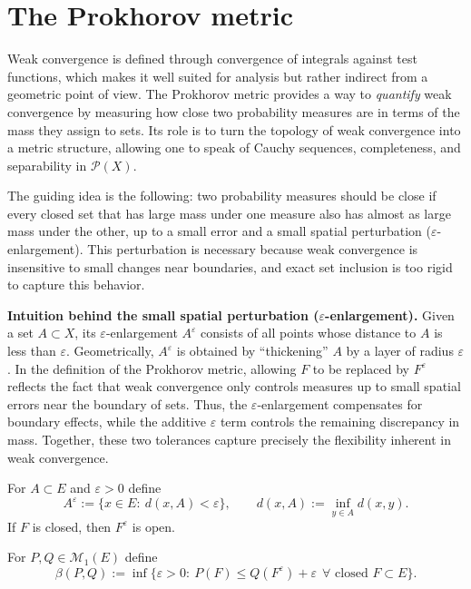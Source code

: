 \section{The Prokhorov metric}

Weak convergence is defined through convergence of integrals against test functions, which makes it well suited for analysis but rather indirect from a geometric point of view.
The Prokhorov metric provides a way to \emph{quantify} weak convergence by measuring how close two probability measures are in terms of the mass they assign to sets.
Its role is to turn the topology of weak convergence into a metric structure, allowing one to speak of Cauchy sequences, completeness, and separability in $\mathcal{P}(X)$.

\medskip

\noindent
The guiding idea is the following: two probability measures should be close if every closed set that has large mass under one measure also has almost as large mass under the other, up to a small error and a small spatial perturbation ($\varepsilon$-enlargement).
This perturbation is necessary because weak convergence is insensitive to small changes near boundaries, and exact set inclusion is too rigid to capture this behavior.

\medskip

\noindent
\textbf{Intuition behind the small spatial perturbation ($\varepsilon$-enlargement).}
Given a set $A\subset X$, its $\varepsilon$-enlargement $A^\varepsilon$ consists of all points whose distance to $A$ is less than $\varepsilon$.
Geometrically, $A^\varepsilon$ is obtained by ``thickening'' $A$ by a layer of radius $\varepsilon$.
In the definition of the Prokhorov metric, allowing $F$ to be replaced by $F^\varepsilon$ reflects the fact that weak convergence only controls measures up to small spatial errors near the boundary of sets.
Thus, the $\varepsilon$-enlargement compensates for boundary effects, while the additive $\varepsilon$ term controls the remaining discrepancy in mass.
Together, these two tolerances capture precisely the flexibility inherent in weak convergence.


\begin{definition}
For $A\subset E$ and $\varepsilon>0$ define
\[
A^\varepsilon:=\{x\in E:\ d(x,A)<\varepsilon\},
\qquad d(x,A):=\inf_{y\in A} d(x,y).
\]
If $F$ is closed, then $F^\varepsilon$ is open.
\end{definition}

\begin{definition}
For $P,Q\in\mathcal{M}_1(E)$ define
\[
\beta(P,Q):=\inf\Big\{\varepsilon>0:\ P(F)\le Q(F^\varepsilon)+\varepsilon\ \ \forall \text{ closed }F\subset E\Big\}.
\]
\end{definition}

